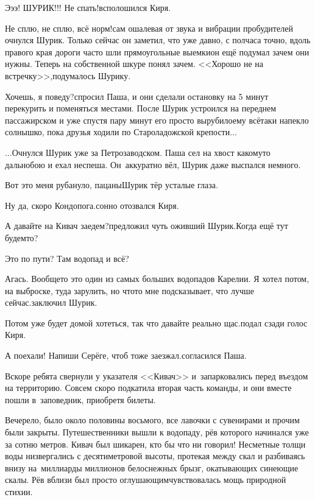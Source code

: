 \diagdash Э\sdash э\sdash э! ШУРИК!!! Не спать!\mdash всполошился Киря.

\diagdash Не сплю, не сплю, всё норм!\mdash сам ошалевая от звука и вибрации пробудителей очнулся Шурик. Только сейчас он заметил, что уже давно, с полчаса точно, вдоль правого края дороги часто шли прямоугольные выемки\mdash он ещё подумал зачем они нужны. Теперь на собственной шкуре понял зачем. <<Хорошо не на встречку>>,\mdash подумалось Шурику.

\diagdash Хочешь, я поведу?\mdash спросил Паша, и они сделали остановку на 5 минут перекурить и поменяться местами. После Шурик устроился на переднем пассажирском и уже спустя пару минут его просто вырубило\mdash ему всё\sdash таки напекло солнышко, пока друзья ходили по Староладожской крепости$\ldots$


$\ldots$Очнулся Шурик уже за Петрозаводском. Паша сел на хвост какому\sdash то дальнобою и ехал неспеша. Он~аккуратно вёл, Шурик даже выспался немного.

\diagdash Вот это меня рубануло, пацаны\mdash Шурик тёр усталые глаза.

\diagdash Ну да, скоро Кондопога.\mdash сонно отозвался Киря.

\diagdash А давайте на Кивач заедем?\mdash предложил чуть оживший Шурик.\mdash Когда ещё тут будем\sdash то?

\diagdash Это по пути? Там водопад и всё?

\diagdash Агась. Вообще\sdash то это один из самых больших водопадов Карелии. Я хотел потом, на выброске, туда зарулить, но что\sdash то мне подсказывает, что лучше сейчас.\mdash заключил Шурик.

\diagdash Потом уже будет домой хотеться, так что давайте реально щас.\mdash подал сзади голос Киря.

\diagdash А поехали! Напиши Серёге, чтоб тоже заезжал.\mdash согласился Паша.

Вскоре ребята свернули у указателя <<Кивач>> и~запарковались перед въездом на территорию. Совсем скоро подкатила вторая часть команды, и они вместе пошли в~заповедник, приобретя билеты.

Вечерело, было около половины восьмого, все лавочки с сувенирами и прочим были закрыты. Путешественники вышли к водопаду, рёв которого начинался уже за сотню метров. Кивач был шикарен, кто бы что ни говорил! Несметные толщи воды низвергались с десятиметровой высоты, протекая между скал и разбиваясь внизу на~миллиарды миллионов белоснежных брызг, окатывающих синеющие скалы. Рёв вблизи был просто оглушающим\mdash чувствовалась мощь природной стихии. 


